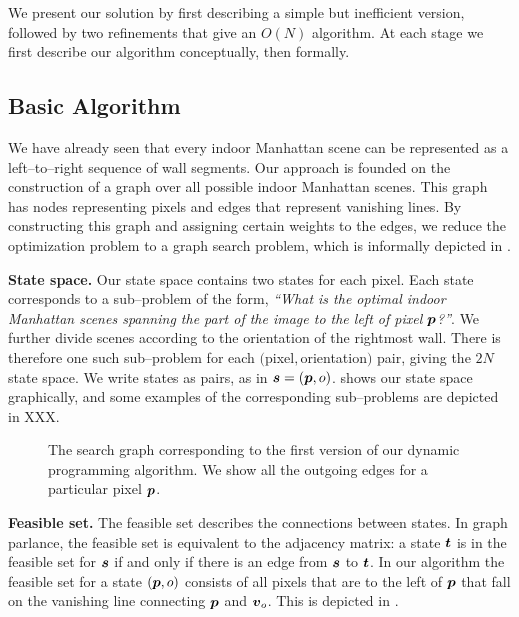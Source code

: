 We present our solution by first describing a simple but inefficient
version, followed by two refinements that give an $O(N)$ algorithm. At
each stage we first describe our algorithm conceptually, then
formally.

\subsection{Basic Algorithm}
\label{sect:basic-alg}

We have already seen that every indoor Manhattan scene can be
represented as a left--to--right sequence of wall segments. Our
approach is founded on the construction of a graph over all possible
indoor Manhattan scenes. This graph has nodes representing pixels and
edges that represent vanishing lines. By constructing this graph and
assigning certain weights to the edges, we reduce the optimization
problem  to a graph search problem, which is
informally depicted in .

\textbf{State space.} Our state space contains two states for each
pixel. Each state corresponds to a sub--problem of the form,
\textit{``What is the optimal indoor Manhattan scenes spanning the
  part of the image to the left of pixel $\Pixel$?''}. We further
divide scenes according to the orientation of the rightmost
wall. There is therefore one such sub--problem for each
$($pixel$,$orientation$)$ pair, giving the $2N$ state space. We write
states as pairs, as in
$\State=(\Pixel,\WallOrient)$.  shows our state
space graphically, and some examples of the corresponding
sub--problems are depicted in XXX.

\begin{figure}[tb]
  \centering
  \caption{The search graph corresponding to the first version of our
    dynamic programming algorithm. We show all the outgoing edges for
    a particular pixel $\vect{p}$.}
  \label{fig:dp-seach-graph}
\end{figure}

\textbf{Feasible set.} The feasible set describes the connections
between states. In graph parlance, the feasible set is equivalent to
the adjacency matrix: a state $\OtherState$ is in the feasible set for
$\State$ if and only if there is an edge from $\State$ to
$\OtherState$. In our algorithm the feasible set for a state
$(\Pixel,\WallOrient)$ consists of all pixels that are to the left of
$\Pixel$ that fall on the vanishing line connecting $\Pixel$ and
$\vpt_{\WallOrient}$. This is depicted in .

